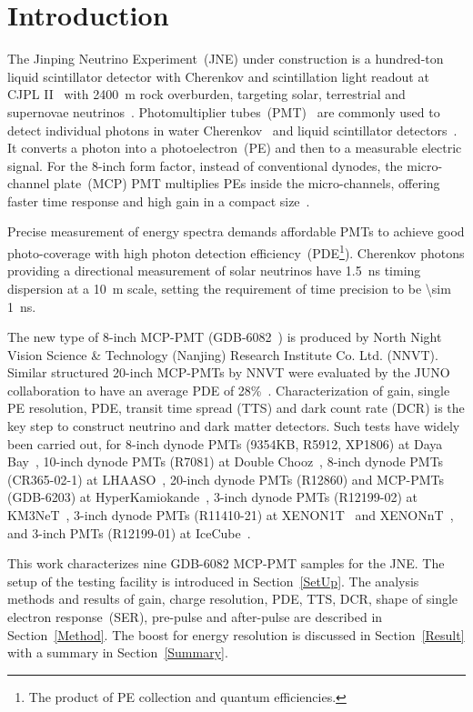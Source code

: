 \section{Introduction}
The Jinping Neutrino Experiment~(JNE) under construction is a hundred-ton liquid scintillator detector with Cherenkov and scintillation light readout
 at CJPL II~\cite{li_second-phase_2015,cheng_china_2017} with \SI{2400}{m} rock overburden, targeting solar, terrestrial and supernovae neutrinos~\cite{LetterJNE2017,xu_jinping_2020,xu_innovations_2022,xu_design_2022}.
Photomultiplier tubes~(PMT)~\cite{HAMAMATSUManual} are commonly used to detect individual photons in water Cherenkov~\cite{SNO,SuperK} and liquid scintillator detectors~\cite{KamLAND,JUNO:2015zny}. It converts a photon into a photoelectron~(PE) and then to a measurable electric signal.  For the 8-inch form factor, instead of conventional dynodes, the micro-channel plate~(MCP) PMT multiplies PEs inside the micro-channels, offering faster time response and high gain in a compact size~\cite{WANG2012113,MCP-PMTworkgroup:2021hoy,HAMAMATSUManual}.

Precise measurement of energy spectra demands affordable PMTs to achieve good photo-coverage with high photon detection efficiency~(PDE\footnote{The product of PE collection and quantum efficiencies.}). Cherenkov photons providing a directional measurement of solar neutrinos have \SI{1.5}{ns} timing dispersion at a \SI{10}{m} scale, setting the requirement of time precision to be \SI{\sim 1}{ns}.


The new type of 8-inch MCP-PMT (GDB-6082~\cite{GDB-6082}) is produced by North Night Vision Science \& Technology (Nanjing) Research Institute Co. Ltd. (NNVT). %
Similar structured 20-inch MCP-PMTs by NNVT were evaluated by the JUNO collaboration to have an average PDE of 28\%~\cite{JUNOMassTesting}.
Characterization of gain, single PE resolution, PDE, transit time spread (TTS) and dark count rate (DCR) is the key step to construct neutrino and dark matter detectors. Such tests have widely been carried out, for 8-inch dynode PMTs (9354KB, R5912, XP1806) at Daya Bay~\cite{DayaBayTesting}, 10-inch dynode PMTs (R7081) at Double Chooz~\cite{DoubleChoozeTesting}, 8-inch dynode PMTs (CR365-02-1) at LHAASO~\cite{LHAASOTesting}, 20-inch dynode PMTs (R12860) and MCP-PMTs (GDB-6203) at HyperKamiokande~\cite{HyperKTesting}, 3-inch dynode PMTs (R12199-02) at KM3NeT~\cite{KM3NetTesting}, 3-inch dynode PMTs (R11410-21) at XENON1T~\cite{XENON1TTesting} and XENONnT~\cite{XENONnTTesting}, and 3-inch PMTs (R12199-01) at IceCube~\cite{IceCubeTesting}.

This work characterizes nine GDB-6082 MCP-PMT samples for the JNE.  The setup of the testing facility is introduced in Section~\ref{SetUp}. The analysis methods and results of gain, charge resolution, PDE, TTS, DCR, shape of single electron response~(SER), pre-pulse and after-pulse are described in Section~\ref{Method}. The boost for energy resolution is discussed in Section~\ref{Result} with a summary in Section~\ref{Summary}.
